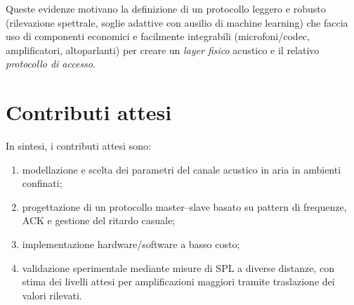 Queste evidenze motivano la definizione di un protocollo leggero e robusto (rilevazione spettrale, soglie adattive con ausilio di machine learning) che faccia uso di componenti economici e facilmente integrabili (microfoni/codec, 
amplificatori, altoparlanti) per creare un \emph{layer fisico} acustico e il relativo \emph{protocollo di accesso}.

\section{Contributi attesi}
\label{sec:contributi_attesi}
In sintesi, i contributi attesi sono: 
\begin{enumerate}
\item modellazione e scelta dei parametri del canale acustico in aria in ambienti confinati;
\item progettazione di un protocollo master--slave basato su pattern di frequenze, ACK e gestione del ritardo casuale;
\item implementazione hardware/software a basso costo;
\item validazione sperimentale mediante misure di SPL a diverse distanze, con stima dei livelli attesi per amplificazioni maggiori tramite traslazione dei valori rilevati.
\end{enumerate}
